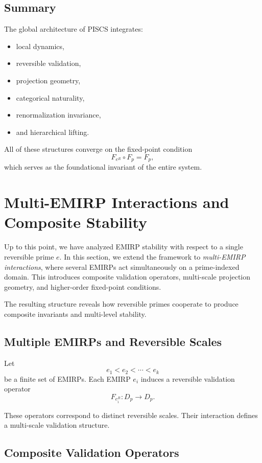 \documentclass[11pt]{article}
\theoremstyle{definition}
\theoremstyle{plain}
\theoremstyle{remark}
\begin{document}
\subsection{Summary}

The global architecture of PISCS integrates:
\begin{itemize}
    \item local dynamics,
    \item reversible validation,
    \item projection geometry,
    \item categorical naturality,
    \item renormalization invariance,
    \item and hierarchical lifting.
\end{itemize}

All of these structures converge on the fixed-point condition
\[
F_{e^R} \circ F_p = F_p,
\]
which serves as the foundational invariant of the entire system.

\section{Multi-EMIRP Interactions and Composite Stability}

Up to this point, we have analyzed EMIRP stability with respect to a
single reversible prime $e$. In this section, we extend the framework to
\emph{multi-EMIRP interactions}, where several EMIRPs act simultaneously
on a prime-indexed domain. This introduces composite validation
operators, multi-scale projection geometry, and higher-order fixed-point
conditions.

The resulting structure reveals how reversible primes cooperate to
produce composite invariants and multi-level stability.

\subsection{Multiple EMIRPs and Reversible Scales}

Let
\[
e_1 < e_2 < \cdots < e_k
\]
be a finite set of EMIRPs. Each EMIRP $e_i$ induces a reversible
validation operator
\[
F_{e_i^R} : D_p \to D_p.
\]

These operators correspond to distinct reversible scales. Their
interaction defines a multi-scale validation structure.

\subsection{Composite Validation Operators}
\end{document}
